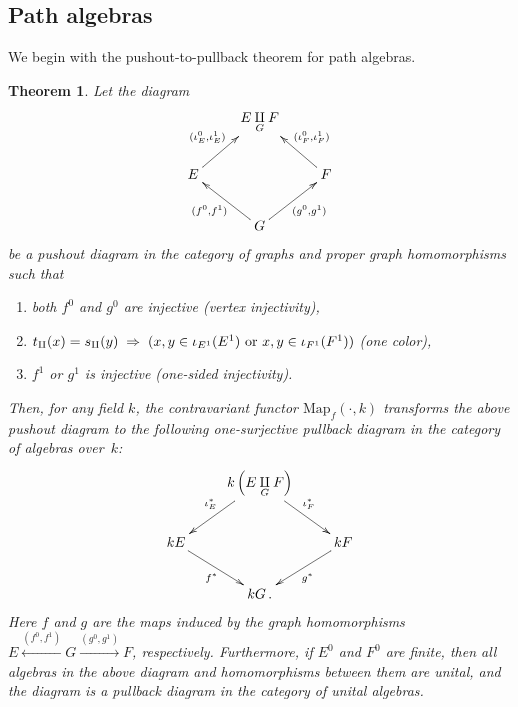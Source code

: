 \documentclass[12pt,times,a4paper]{amsart}
\newtheorem{theorem}{Theorem}[section]
\numberwithin{equation}{section}
\def\text{\hbox}
\numberwithin{equation}{section}
\begin{document}
\subsection{Path algebras}
We begin with  the pushout-to-pullback theorem for path algebras.
\begin{theorem}\label{pushpullpaththm}
Let the diagram
\begin{equation}\label{pushdiag0}
\xymatrix{
&
E\underset{G}{\amalg}F
&\\
E
\ar[ur]^{(\iota^0_{E},\iota^1_{E})}& & 
F
\ar[ul]_{(\iota^0_{F},\iota^1_{F})}\\
&
G
\ar[ur]_{(g^0,g^1)}\ar[ul]^{(f^0,f^1)}&
}
\end{equation}
be a pushout diagram in the category of graphs and proper graph homomorphisms such that
\vspace*{-2mm}
\begin{enumerate}
\item
both $f^0$ and $g^0$ are injective (vertex injectivity),
\item
$t_\amalg(x)=s_\amalg(y)\;\Rightarrow\;(x,y\in\iota_{E^1}(E^1)\text{ or }x,y\in\iota_{F^1}(F^1))$
(one color),
\item
$f^1$ or $g^1$ is injective (one-sided injectivity).
\end{enumerate}
Then, for any field $k$, the contravariant functor $\mathrm{Map}_f(\cdot,k)$ 
transforms the above pushout diagram to the following one-surjective pullback
diagram in the category of  algebras over~$k$:
\begin{equation*}
\xymatrix{
&
k\left(E\underset{G}{\amalg}F\right)
\ar[dl]_{\iota_E^*} \ar[dr]^{\iota_F^*}&\\
kE \ar[dr]_{f^*} & & 
kF\ar[dl]^{g^*}\\
&
kG\,.&
}
\end{equation*}
Here $f$ and $g$ are the maps induced by the graph homomorphisms
$E\stackrel{(f^0,f^1)}{\longleftarrow} G\stackrel{(g^0,g^1)}{\longrightarrow} F$, respectively.
Furthermore, if $E^0$ and $F^0$ are finite, then all algebras in the above diagram and homomorphisms 
between them are unital, and the diagram is a pullback diagram in the category of unital algebras.
\end{theorem}
\end{document}
